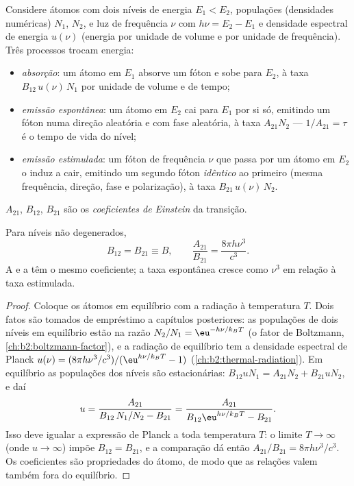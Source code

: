 \begin{definition}\label{def:b2:laser:processes}
Considere átomos com dois níveis de energia $E_1 < E_2$, populações (densidades
numéricas) $N_1$, $N_2$, e luz de frequência $\nu$ com
$h\nu = E_2 - E_1$ e densidade espectral de energia $u(\nu)$ (energia por unidade de
volume e por unidade de frequência). Três processos trocam energia:
\begin{itemize}
\item \emph{absorção}: um átomo em
      $E_1$ absorve um fóton e sobe para $E_2$, à taxa
      $B_{12}\,u(\nu)\,N_1$ por unidade de volume e de tempo;
\item \emph{emissão espontânea}: um átomo
      em $E_2$ cai para $E_1$ por si só, emitindo um fóton numa direção
      aleatória e com fase aleatória, à taxa $A_{21}N_2$ ---
      $1/A_{21} = \tau$ é o tempo de vida do nível;
\item \emph{emissão estimulada}: um fóton
      de frequência $\nu$ que passa por um átomo em $E_2$ o induz a cair,
      emitindo um segundo fóton \emph{idêntico} ao primeiro (mesma
      frequência, direção, fase e polarização), à taxa
      $B_{21}\,u(\nu)\,N_2$.
\end{itemize}
$A_{21}$, $B_{12}$, $B_{21}$ são os \emph{coeficientes de
Einstein} da transição.
\end{definition}

\begin{proposition}\label{prop:b2:laser:einstein}
Para níveis não degenerados,
\[
B_{12} = B_{21} \equiv B, \qquad
\frac{A_{21}}{B_{21}} = \frac{8\pi h\nu^3}{c^3}.
\]
A  e a  têm o mesmo coeficiente; a taxa
espontânea cresce como $\nu^3$ em relação à taxa estimulada.
\end{proposition}

\begin{proof}
Coloque os átomos em equilíbrio com a radiação à temperatura $T$. Dois
fatos são tomados de empréstimo a capítulos posteriores: as populações de dois níveis
em equilíbrio estão na razão $N_2/N_1 = \eu^{-h\nu/k_BT}$ (o
fator de Boltzmann, \cref{ch:b2:boltzmann-factor}), e a radiação de
equilíbrio tem a densidade espectral de Planck
$u(\nu) = (8\pi h\nu^3/c^3)/(\eu^{h\nu/k_BT} - 1)$
(\cref{ch:b2:thermal-radiation}). Em equilíbrio as populações dos níveis
são estacionárias: $B_{12}uN_1 = A_{21}N_2 + B_{21}uN_2$, e daí
\[
u = \frac{A_{21}}{B_{12}\,N_1/N_2 - B_{21}}
  = \frac{A_{21}}{B_{12}\eu^{h\nu/k_BT} - B_{21}}.
\]
Isso deve igualar a expressão de Planck a toda temperatura $T$: o
limite $T \to \infty$ (onde $u \to \infty$) impõe $B_{12} = B_{21}$, e a
comparação dá então $A_{21}/B_{21} = 8\pi h\nu^3/c^3$. Os
coeficientes são propriedades do átomo, de modo que as relações valem também fora do
equilíbrio.
\end{proof}

